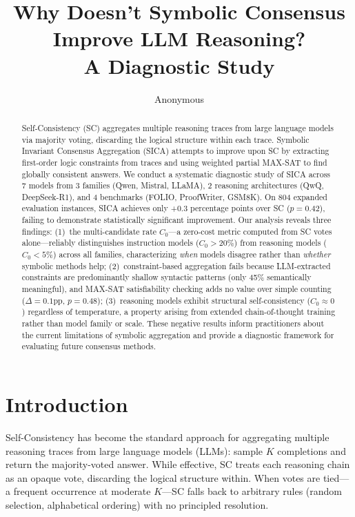 \documentclass[11pt,a4paper]{article}
\title{Why Doesn't Symbolic Consensus Improve LLM Reasoning?\\A Diagnostic Study}
\author{Anonymous}
\date{}
\begin{document}
\maketitle

\begin{abstract}
Self-Consistency (SC) aggregates multiple reasoning traces from large language models via majority voting, discarding the logical structure within each trace.
Symbolic Invariant Consensus Aggregation (SICA) attempts to improve upon SC by extracting first-order logic constraints from traces and using weighted partial MAX-SAT to find globally consistent answers.
We conduct a systematic diagnostic study of SICA across 7 models from 3 families (Qwen, Mistral, LLaMA), 2 reasoning architectures (QwQ, DeepSeek-R1), and 4 benchmarks (FOLIO, ProofWriter, GSM8K).
On 804 expanded evaluation instances, SICA achieves only +0.3 percentage points over SC ($p=0.42$), failing to demonstrate statistically significant improvement.
Our analysis reveals three findings:
(1)~the multi-candidate rate $C_0$---a zero-cost metric computed from SC votes alone---reliably distinguishes instruction models ($C_0>20\%$) from reasoning models ($C_0<5\%$) across all families, characterizing \emph{when} models disagree rather than \emph{whether} symbolic methods help;
(2)~constraint-based aggregation fails because LLM-extracted constraints are predominantly shallow syntactic patterns (only 45\% semantically meaningful), and MAX-SAT satisfiability checking adds no value over simple counting ($\Delta=0.1$pp, $p=0.48$);
(3)~reasoning models exhibit structural self-consistency ($C_0\approx0$) regardless of temperature, a property arising from extended chain-of-thought training rather than model family or scale.
These negative results inform practitioners about the current limitations of symbolic aggregation and provide a diagnostic framework for evaluating future consensus methods.
\end{abstract}

\section{Introduction}
\label{sec:intro}

Self-Consistency \cite{wang2023selfconsistency} has become the standard approach for aggregating multiple reasoning traces from large language models (LLMs): sample $K$ completions and return the majority-voted answer.
While effective, SC treats each reasoning chain as an opaque vote, discarding the logical structure within.
When votes are tied---a frequent occurrence at moderate $K$---SC falls back to arbitrary rules (random selection, alphabetical ordering) with no principled resolution.
\end{document}
